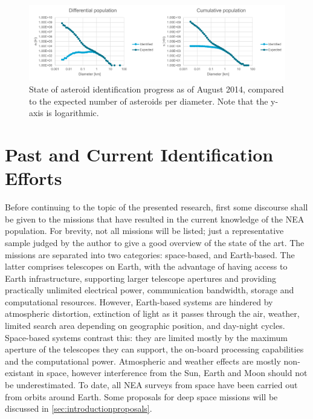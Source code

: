 \begin{figure}[htbp]
 \centering
 \includegraphics[width=1.0\textwidth]{img/population_estimates.pdf}
 \caption{State of asteroid identification progress as of August 2014, compared to the expected number of asteroids per diameter. Note that the y-axis is logarithmic. \cite{HarrisPopulation}}
 \label{fig:population_estimates}
\end{figure}


\section{Past and Current Identification Efforts}
\label{sec:introductionidentification}

Before continuing to the topic of the presented research, first some discourse shall be given to the missions that have resulted in the current knowledge of the NEA population. For brevity, not all missions will be listed; just a representative sample judged by the author to give a good overview of the state of the art. The missions are separated into two categories: space-based, and Earth-based. The latter comprises telescopes on Earth, with the advantage of having access to Earth infrastructure, supporting larger telescope apertures and providing practically unlimited electrical power, communication bandwidth, storage and computational resources. However, Earth-based systems are hindered by atmospheric distortion, extinction of light as it passes through the air, weather, limited search area depending on geographic position, and day-night cycles. Space-based systems contrast this: they are limited mostly by the maximum aperture of the telescopes they can support, the on-board processing capabilities and the computational power. Atmospheric and weather effects are mostly non-existant in space, however interference from the Sun, Earth and Moon should not be underestimated. To date, all NEA surveys from space have been carried out from orbits around Earth. Some proposals for deep space missions will be discussed in \autoref{sec:introductionproposals}.\\

